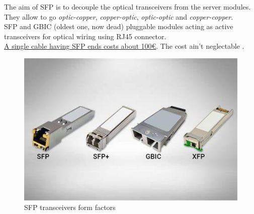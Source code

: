 \begin{paracol}{2}
   
   The aim of SFP is to decouple the optical transceivers from the server modules.
   They allow to go \textit{optic-copper}, \textit{copper-optic}, \textit{optic-optic} and \textit{copper-copper}.\\
   SFP and GBIC (oldest one, now dead) pluggable modules acting as active transceivers for optical wiring using RJ45 connector.\\
   \ul{A single cable having SFP ends costs about 100€}.
   The cost ain't neglectable \smiley.


   \switchcolumn

   \begin{figure}[htbp]
      \centering
      \includegraphics{images/sfp.jpeg}
      \caption{SFP transceivers form factors}
      \label{fig:sfp}
   \end{figure}
\end{paracol}

